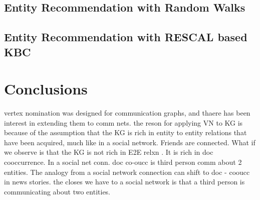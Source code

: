 \documentclass[paper=a4,fontsize=11pt]{scrartcl}
\numberwithin{equation}{section}    %
\numberwithin{figure}{section}      %
\numberwithin{table}{section}       %
\begin{document}
\subsection{Entity Recommendation with Random Walks}
\label{sec:er-rw}



\subsection{Entity Recommendation with RESCAL based KBC}
\label{sec:er-rescal}


\section{Conclusions}
\label{sec:conclusions}

\begin{snugshade}
  {vertex nomination was designed for communication graphs, and thaere has
been interest in extending them to comm nets. the reson for applying VN to KG is
because of the assumption that the KG is rich in entity to entity relations that
have been acquired, much like in a social network. Friends are connected. What
if we observe is that the KG is not rich in E2E relxn . It is rich in doc
cooccurrence. In a social net conn. doc co-oucc is third person comm about 2
entities. The analogy from a social network connection can shift to doc - cooucc
in news stories. the closes we have to a social network is that a third person
is communicating about two entities.}
\end{snugshade}


\end{document}

